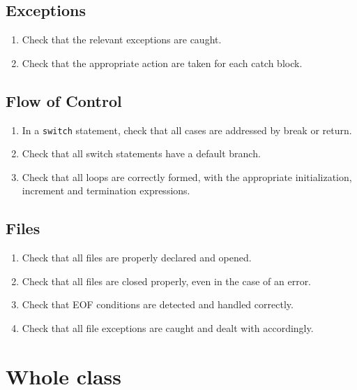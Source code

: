 \section{Exceptions}\begin{enumerate}[resume]
\item \label{item:X}Check that the relevant exceptions are caught.
\item \label{item:X}Check that the appropriate action are taken for each catch block.
\end{enumerate}

\section{Flow of Control}\begin{enumerate}[resume]
\item \label{item:X}In a \texttt{switch} statement, check that all cases are addressed by break or return.
\item \label{item:X}Check that all switch statements have a default branch.
\item \label{item:X}Check that all loops are correctly formed, with the appropriate initialization, increment and termination expressions.
\end{enumerate}

\section{Files}\begin{enumerate}[resume]
\item \label{item:X}Check that all files are properly declared and opened.
\item \label{item:X}Check that all files are closed properly, even in the case of an error.
\item \label{item:X}Check that EOF conditions are detected and handled correctly.
\item \label{item:X}Check that all file exceptions are caught and dealt with accordingly.
\end{enumerate}












\chapter{Whole class}
















